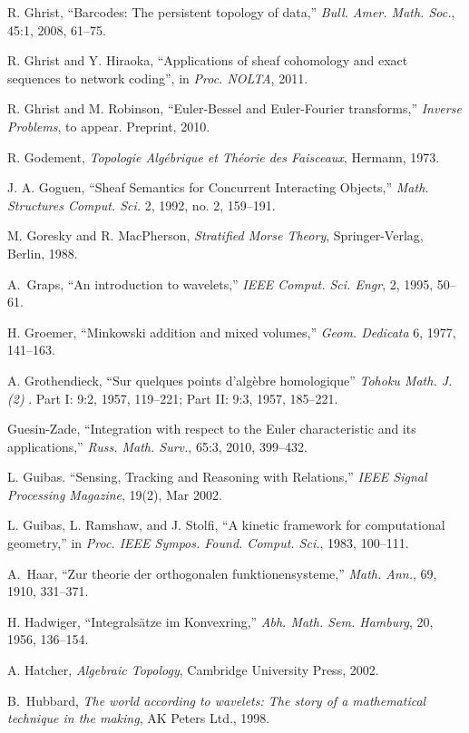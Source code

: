 \documentclass{psapm-l}
\theoremstyle{definition}
\theoremstyle{remark}
\numberwithin{equation}{section}
\begin{document}
{\begin{thebibliography}{A}
 R. Ghrist, ``Barcodes: The persistent topology of data,'' {\em Bull. Amer. Math. Soc.}, 45:1, 2008, 61--75.

 R. Ghrist and Y. Hiraoka, ``Applications of sheaf cohomology and exact sequences to network coding'', in {\em Proc. NOLTA}, 2011.

 R. Ghrist and M. Robinson, ``Euler-Bessel and Euler-Fourier transforms,'' {\em Inverse Problems}, to appear. Preprint, 2010.

 R. Godement, {\em Topologie Alg\'ebrique et Th\'eorie des Faisceaux}, Hermann, 1973.

 J. A. Goguen, ``Sheaf Semantics for Concurrent Interacting Objects,'' {\em Math. Structures Comput. Sci.} 2, 1992, no. 2, 159--191.

 M. Goresky and R. MacPherson, {\em Stratified Morse Theory}, Springer-Verlag, Berlin, 1988.

 A.~Graps, ``An introduction to wavelets,'' {\em IEEE Comput. Sci. Engr}, 2, 1995, 50--61.

 H. Groemer, ``Minkowski addition and mixed volumes,'' {\em Geom. Dedicata} 6, 1977, 141--163.

 A. Grothendieck, ``Sur quelques points d'alg\`ebre homologique'' {\em Tohoku Math. J. (2) }. Part I: 9:2, 1957, 119--221; Part II: 9:3, 1957, 185--221.

 Guesin-Zade, ``Integration with respect to the Euler characteristic and its applications,'' {\em Russ. Math. Surv.}, 65:3, 2010, 399--432.

 L. Guibas. ``Sensing, Tracking and Reasoning with Relations,'' {\em IEEE Signal Processing Magazine}, 19(2), Mar 2002.

 L. Guibas, L. Ramshaw, and J. Stolfi, ``A kinetic framework for computational geometry,'' in {\em Proc. IEEE Sympos. Found. Comput. Sci.}, 1983, 100--111.

A.~Haar, ``Zur theorie der orthogonalen funktionensysteme,'' {\em Math.  Ann.}, 69, 1910, 331--371.

 H. Hadwiger, ``Integrals\"atze im Konvexring,'' {\em Abh. Math. Sem. Hamburg}, 20, 1956, 136--154.

 A. Hatcher, \emph{Algebraic Topology}, Cambridge University Press, 2002.

 B.~Hubbard, \emph{The world according to wavelets: The story of a mathematical technique in the making}, AK Peters Ltd., 1998.


\end{thebibliography}}
\end{document}
